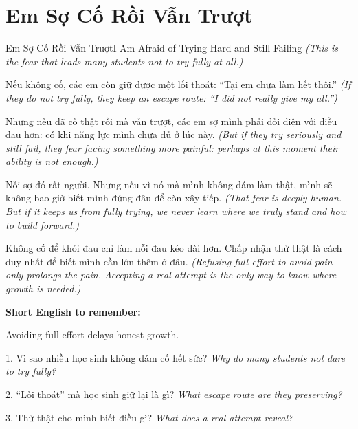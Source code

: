 \section{Em Sợ Cố Rồi Vẫn Trượt}
\begin{truyen}{Em Sợ Cố Rồi Vẫn Trượt}{I Am Afraid of Trying Hard and Still Failing}
\textit{(This is the fear that leads many students not to try fully at all.)}

Nếu không cố, các em còn giữ được một lối thoát: “Tại em chưa làm hết thôi.”
\textit{(If they do not try fully, they keep an escape route: “I did not really give my all.”)}

Nhưng nếu đã cố thật rồi mà vẫn trượt, các em sợ mình phải đối diện với điều đau hơn: có khi năng lực mình chưa đủ ở lúc này.
\textit{(But if they try seriously and still fail, they fear facing something more painful: perhaps at this moment their ability is not enough.)}

Nỗi sợ đó rất người. Nhưng nếu vì nó mà mình không dám làm thật, mình sẽ không bao giờ biết mình đứng đâu để còn xây tiếp.
\textit{(That fear is deeply human. But if it keeps us from fully trying, we never learn where we truly stand and how to build forward.)}
\end{truyen}

\begin{baihoc}
Không cố để khỏi đau chỉ làm nỗi đau kéo dài hơn. Chấp nhận thử thật là cách duy nhất để biết mình cần lớn thêm ở đâu.
\textit{(Refusing full effort to avoid pain only prolongs the pain. Accepting a real attempt is the only way to know where growth is needed.)}
\end{baihoc}

\begin{ghinhoanh}
\textbf{Short English to remember:}

Avoiding full effort delays honest growth.

\end{ghinhoanh}

\begin{tuhocnhanh}
1. Vì sao nhiều học sinh không dám cố hết sức? \textit{Why do many students not dare to try fully?}

2. “Lối thoát” mà học sinh giữ lại là gì? \textit{What escape route are they preserving?}

3. Thử thật cho mình biết điều gì? \textit{What does a real attempt reveal?}
\end{tuhocnhanh}
\ngancach

